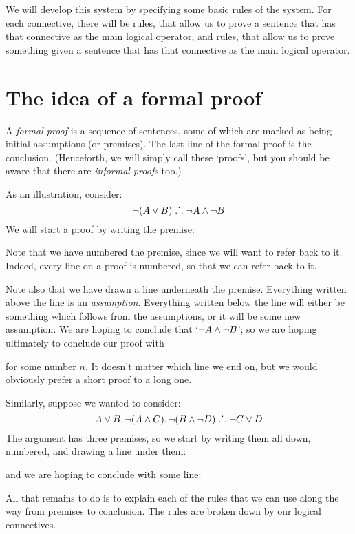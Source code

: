 We will develop this  system by specifying some basic rules of the system. For each connective, there will be  rules, that allow us to prove a sentence that has that connective as the main logical operator, and  rules, that allow us to prove something given a sentence that has that connective as the main logical operator.

\section{The idea of a formal proof}
A \emph{formal proof} is a sequence of sentences, some of which are marked as being initial assumptions (or premises). The last line of the formal proof is the conclusion. (Henceforth, we will simply call these `proofs', but you should be aware that there are \emph{informal proofs} too.)

As an illustration, consider:
	$$\neg (A \vee B) \mathrel{\ldotp\dot{}\,\ldotp} \neg A \wedge \neg B$$
We will start a proof by writing the premise:
\begin{pf}
\end{pf}
Note that we have numbered the premise, since we will want to refer back to it. Indeed, every line on a proof is numbered, so that we can refer back to it. 

Note also that we have drawn a line underneath the premise. Everything written above the line is an \emph{assumption}. Everything written below the line will either be something which follows from the assumptions, or it will be some new assumption. We are hoping to conclude that `$\neg A \wedge \neg B$'; so we are hoping ultimately to conclude our proof with
\begin{pf}
\end{pf}
for some number $n$. It doesn't matter which line we end on, but we would obviously prefer a short proof to a long one.

Similarly, suppose we wanted to consider:
$$A\vee B, \neg (A\wedge C), \neg (B \wedge \neg D) \mathrel{\ldotp\dot{}\,\ldotp} \neg C\vee D$$
The argument has three premises, so we start by writing them all down, numbered, and drawing a line under them:
\begin{pf}
\end{pf}
and we are hoping to conclude with some line:
\begin{pf}
\end{pf}
All that remains to do is to explain each of the rules that we can use along the way from premises to conclusion. The rules are broken down by our logical connectives.


